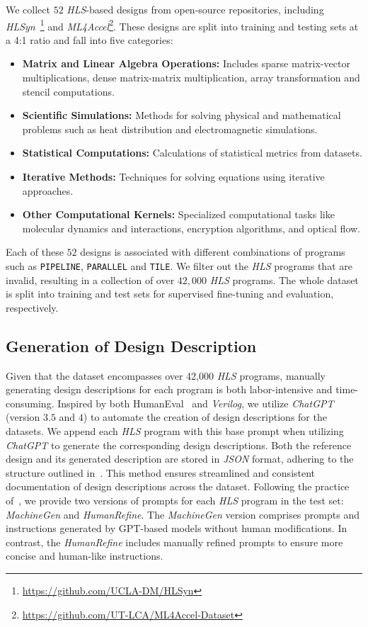 We collect $52$ \textit{HLS}-based designs from open-source repositories, including \textit{HLSyn}~\cite{bai2023towards}\footnote{\url{https://github.com/UCLA-DM/HLSyn}} and \textit{ML4Accel}\footnote{\url{https://github.com/UT-LCA/ML4Accel-Dataset}}.
These designs are split into training and testing sets at a 4:1 ratio and fall into five categories:
\begin{itemize}[leftmargin=*]
    \item \textbf{Matrix and Linear Algebra Operations:} Includes sparse matrix-vector multiplications, dense matrix-matrix multiplication, array transformation and stencil computations.
    \item \textbf{Scientific Simulations:} Methods for solving physical and mathematical problems such as heat distribution and electromagnetic simulations.
    \item \textbf{Statistical Computations:} Calculations of statistical metrics from datasets.
    \item \textbf{Iterative Methods:} Techniques for solving equations using iterative approaches.
    \item \textbf{Other Computational Kernels:} Specialized computational tasks like molecular dynamics and interactions, encryption algorithms, and optical flow.
\end{itemize}
Each of these $52$ designs is associated with different combinations of programs such as \texttt{PIPELINE}, \texttt{PARALLEL} and \texttt{TILE}.
We filter out the \textit{HLS} programs that are invalid,
resulting in a collection of over $42,000$ \textit{HLS} programs. The whole dataset is split into training and test sets for supervised fine-tuning and evaluation, respectively.

\subsection{Generation of Design Description}\label{subsec:benchmark_desciption}
Given that the dataset encompasses over 42,000 \textit{HLS} programs, manually generating design descriptions for each program is both labor-intensive and time-consuming. 
Inspired by both HumanEval~\cite{chen2021evaluating} and \textit{Verilog},
we utilize \textit{ChatGPT} (version $3.5$ and $4$) to automate the creation of design descriptions for the datasets. 
We append each \textit{HLS} program with this base prompt when utilizing \textit{ChatGPT} to generate the corresponding design descriptions.
Both the reference design and its generated description are stored in \textit{JSON} format, adhering to the structure outlined in~. This method ensures streamlined and consistent documentation of design descriptions across the dataset.
Following the practice of~\cite{liu2023verilogeval}, we provide two versions of prompts for each \textit{HLS} program in the test set: \textit{MachineGen} and \textit{HumanRefine}.
The \textit{MachineGen} version comprises prompts and instructions generated by GPT-based models without human modifications. In contrast, the \textit{HumanRefine} includes manually refined prompts to ensure more concise and human-like instructions.

